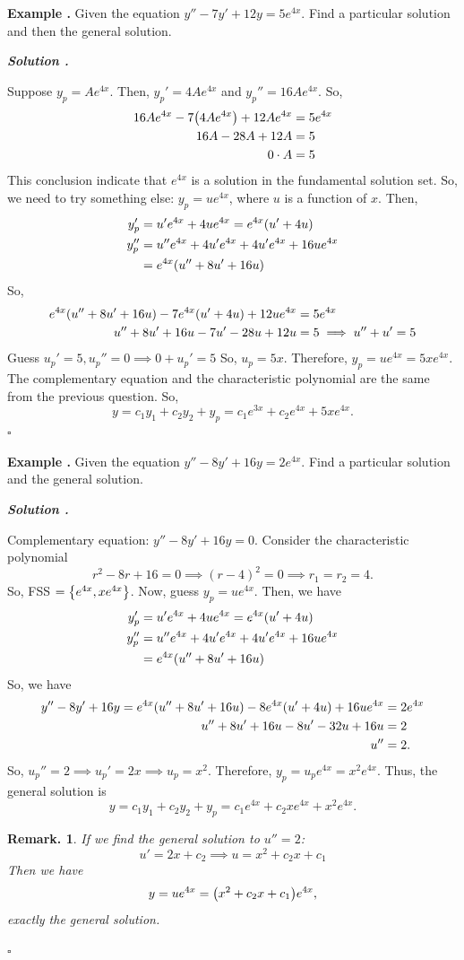 \documentclass[12pt, a4paper]{article}
\newcounter{index}[subsection]
\newenvironment*{eg}{\begin{framed}\par\noindent\textbf{Example \thesubsection.\stepcounter{index}\theindex}}{\par\end{framed}}
\newcounter{nprf}[subsection]
\newenvironment*{sol}{\par\indent\textbf{\textit{Solution \stepcounter{nprf}\thenprf.}}\par}{\hfill{$\square$}\par}
\newtheorem*{rmk}{Remark.}
\begin{document}
\begin{eg}
	Given the equation $y''-7y'+12y=5e^{4x}$. Find a particular solution and then the general solution. 
	\begin{sol}
		Suppose $y_p=Ae^{4x}$. Then, $y_p'=4Ae^{4x}$ and $y_p''=16Ae^{4x}$. So, \begin{align*}16Ae^{4x}-7\qty(4Ae^{4x})+12Ae^{4x}&=5e^{4x}\\16A-28A+12A&=5\\0\cdot A&=5\end{align*} This conclusion indicate that $e^{4x}$ is a solution in the fundamental solution set. So, we need to try something else: $y_p=ue^{4x}$, where $u$ is a function of $x$. Then, \begin{align*}y_p'&=u'e^{4x}+4ue^{4x}=e^{4x}\qty(u'+4u)\\y_p''&=u''e^{4x}+4u'e^{4x}+4u'e^{4x}+16ue^{4x}\\&=e^{4x}\qty(u''+8u'+16u)\end{align*} So, \begin{align*}e^{4x}\qty(u''+8u'+16u)-7e^{4x}\qty(u'+4u)+12ue^{4x}&=5e^{4x}\\u''+8u'+16u-7u'-28u+12u&=5\implies u''+u'=5\end{align*} Guess $u_p'=5, u_p''=0\implies 0+u_p'=5$ So, $u_p=5x$. Therefore, $y_p=ue^{4x}=5xe^{4x}$. The complementary equation and the characteristic polynomial are the same from the previous question. So, \[y=c_1y_1+c_2y_2+y_p=c_1e^{3x}+c_2e^{4x}+5xe^{4x}.\]
	\end{sol}
\end{eg}
\begin{eg}
	Given the equation $y''-8y'+16y=2e^{4x}$. Find a particular solution and the general solution. 
	\begin{sol}
		Complementary equation: $y''-8y'+16y=0$. Consider the characteristic polynomial \[r^2-8r+16=0\implies(r-4)^2=0\implies r_1=r_2=4.\] So, FSS $=\qty{e^{4x}, xe^{4x}}$. Now, guess $y_p=ue^{4x}$. Then, we have \begin{align*}y_p'&=u'e^{4x}+4ue^{4x}=e^{4x}\qty(u'+4u)\\y_p''&=u''e^{4x}+4u'e^{4x}+4u'e^{4x}+16ue^{4x}\\&=e^{4x}\qty(u''+8u'+16u)\end{align*} So, we have \begin{align*}y''-8y'+16y=e^{4x}\qty(u''+8u'+16u)-8e^{4x}\qty(u'+4u)+16ue^{4x}&=2e^{4x}\\u''+8u'+16u-8u'-32u+16u&=2\\u''&=2.\end{align*} So, $u_p''=2\implies u_p'=2x\implies u_p=x^2$. Therefore, $y_p=u_pe^{4x}=x^2e^{4x}$. Thus, the general solution is\[y=c_1y_1+c_2y_2+y_p=c_1e^{4x}+c_2xe^{4x}+x^2e^{4x}.\]
		\begin{rmk}
			If we find the general solution to $u''=2$: \[u'=2x+c_2\implies u=x^2+c_2x+c_1\] Then we have \[y=ue^{4x}=\qty(x^2+c_2x+c_1)e^{4x},\] exactly the general solution. 
		\end{rmk}
	\end{sol}
\end{eg}
\end{document}
